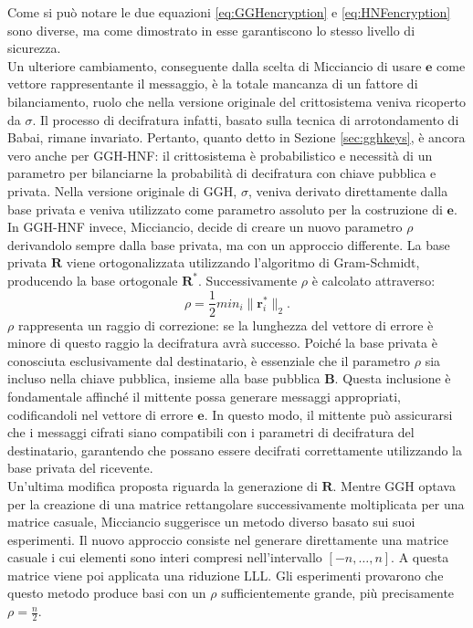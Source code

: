 Come si può notare le due equazioni \ref{eq:GGHencryption} e \ref{eq:HNFencryption} sono
diverse, ma come dimostrato in \cite[sezione 4.3]{HNF01} esse garantiscono lo stesso
livello di sicurezza. \\
Un ulteriore cambiamento, conseguente dalla scelta di Micciancio di usare $\mathbf{e}$ come vettore
rappresentante il messaggio, è la totale mancanza di un fattore di bilanciamento, ruolo che nella
versione originale del crittosistema veniva ricoperto da $\sigma$. 
Il processo di decifratura infatti, 
basato sulla tecnica di arrotondamento di Babai, rimane invariato. Pertanto, quanto detto in 
Sezione \ref{sec:gghkeys}, è ancora vero anche per GGH-HNF: il crittosistema è probabilistico 
e necessità di un parametro per bilanciarne la probabilità di decifratura con chiave pubblica e 
privata. 
Nella versione originale di GGH, $\sigma$, veniva derivato direttamente dalla base privata
e veniva utilizzato come parametro assoluto per la costruzione di $\mathbf{e}$. \\
In GGH-HNF invece, Micciancio, decide di creare un nuovo parametro $\rho$ derivandolo sempre
dalla base privata, ma con un approccio differente. 
La base privata $\mathbf{R}$ viene ortogonalizzata utilizzando l'algoritmo di Gram-Schmidt, 
producendo la base ortogonale $\mathbf{R}^*$. Successivamente $\rho$ è calcolato attraverso:
\begin{equation}
    \label{eq:rho}
    \rho = \frac{1}{2}min_i\|\mathbf{r}^*_i\|_2.
\end{equation}
$\rho$ rappresenta un raggio di correzione: se la lunghezza del vettore di errore 
è minore di questo raggio la decifratura avrà successo. 
Poiché la base privata è conosciuta esclusivamente dal destinatario, è essenziale che il parametro 
$\rho$ sia incluso nella chiave pubblica, insieme alla base pubblica $\mathbf{B}$. Questa inclusione è 
fondamentale affinché il mittente possa generare messaggi appropriati, codificandoli nel vettore di 
errore $\mathbf{e}$. In questo modo, il mittente può assicurarsi che i messaggi cifrati siano compatibili 
con i parametri di decifratura del destinatario, garantendo che possano essere decifrati correttamente 
utilizzando la base privata del ricevente.\\
Un'ultima modifica proposta riguarda la generazione di $\mathbf{R}$. Mentre GGH optava per la creazione 
di una matrice rettangolare successivamente moltiplicata per una matrice casuale, Micciancio suggerisce 
un metodo diverso basato sui suoi esperimenti.
Il nuovo approccio consiste nel generare direttamente una matrice casuale i cui elementi sono interi 
compresi nell'intervallo $[-n, \dots, n]$. A questa matrice viene poi applicata una riduzione LLL. 
Gli esperimenti provarono che questo metodo produce basi con un $\rho$ sufficientemente grande, più
precisamente $\rho = \frac{n}{2}$. 
%
%
